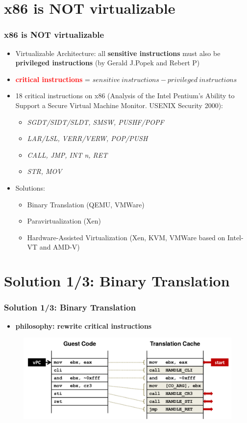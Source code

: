 \documentclass[aspectratio=169]{beamer}
\begin{document}

\section{x86 is NOT virtualizable}
\begin{frame}
\frametitle{x86 is NOT virtualizable}
\begin{itemize}
\item Virtualizable Architecture: all \textbf{sensitive instructions} must also be \textbf{privileged instructions} (by Gerald J.Popek and Rebert P)
\item \textbf{\textcolor{red}{critical instructions}} = $sensitive \ instructions - privileged \ instructions$ \pause
\item 18 critical instructions on x86 (Analysis of the Intel Pentium's Ability to Support a Secure Virtual Machine Monitor. USENIX Security 2000):
	\begin{itemize}
		\item \textit{SGDT/SIDT/SLDT, SMSW, PUSHF/POPF}
		\item \textit{LAR/LSL, VERR/VERW, POP/PUSH}
		\item \textit{CALL, JMP, INT n, RET}
		\item \textit{STR, MOV}
	\end{itemize}
\pause
\item Solutions:
	\begin{itemize}
		\item Binary Translation (QEMU, VMWare)
		\item Paravirtualization (Xen)
		\item Hardware-Assisted Virtualization (Xen, KVM, VMWare based on Intel-VT and AMD-V)
	\end{itemize}
\end{itemize}
\end{frame}


\section{Solution 1/3: Binary Translation}
\begin{frame}
\frametitle{Solution 1/3: Binary Translation}
\begin{itemize}
\item \textbf{philosophy: rewrite critical instructions}
\end{itemize}
\begin{figure}
\includegraphics[width=1.0\linewidth]{figures/qemu.pdf}
\end{figure}
\end{frame}
\end{document}
